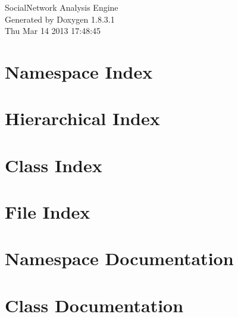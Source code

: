 \documentclass{book}
\begin{document}
\hypersetup{pageanchor=false,citecolor=blue}
\begin{titlepage}
\vspace*{7cm}
\begin{center}
{\Large Social\-Network Analysis Engine }\\
\vspace*{1cm}
{\large Generated by Doxygen 1.8.3.1}\\
\vspace*{0.5cm}
{\small Thu Mar 14 2013 17:48:45}\\
\end{center}
\end{titlepage}
\clearemptydoublepage
{}
\tableofcontents
\clearemptydoublepage
{}
\hypersetup{pageanchor=true,citecolor=blue}
\chapter{Namespace Index}

\chapter{Hierarchical Index}

\chapter{Class Index}

\chapter{File Index}

\chapter{Namespace Documentation}

\chapter{Class Documentation}





















\end{document}

